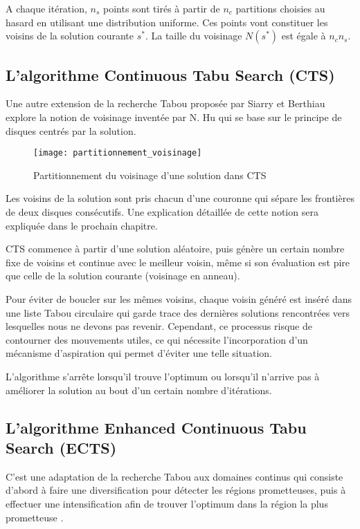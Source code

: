 A chaque itération, $n_s$ points sont tirés à partir de $n_c$ partitions choisies au hasard en utilisant une distribution uniforme. Ces points vont constituer les voisins de la solution courante $s^*$. La taille du voisinage $N(s^*)$ est égale à $n_c n_s$.

\subsection{L'algorithme Continuous Tabu Search (CTS)}
Une autre extension de la recherche Tabou proposée par Siarry et Berthiau \cite{siarry1997fitting} explore la notion de voisinage inventée par N. Hu \cite{Hu_1992} qui se base sur le principe de disques centrés par la solution.

\begin{figure}[H]
	\centering
	\texttt{[image: partitionnement\_voisinage]}
	\caption{Partitionnement du voisinage d'une solution dans CTS}
\end{figure}

Les voisins de la solution sont pris chacun d'une couronne qui sépare les frontières de deux disques consécutifs. Une explication détaillée de cette notion sera expliquée dans le prochain chapitre.

CTS commence à partir d'une solution aléatoire, puis génère un certain nombre fixe de voisins et continue avec le meilleur voisin, même si son évaluation est pire que celle de la solution courante (voisinage en anneau).

Pour éviter de boucler sur les mêmes voisins, chaque voisin généré est inséré dans une liste Tabou circulaire qui garde trace des dernières solutions rencontrées vers lesquelles nous ne devons pas revenir. Cependant, ce processus risque de contourner des mouvements utiles, ce qui nécessite l'incorporation d'un mécanisme d'aspiration qui permet d'éviter une telle situation.  

L'algorithme s'arrête lorsqu'il trouve l'optimum ou lorsqu'il n'arrive pas à améliorer la solution au bout d'un certain nombre d'itérations.
 
\subsection{L'algorithme Enhanced Continuous Tabu Search (ECTS)}
C'est une adaptation de la recherche Tabou aux domaines continus qui consiste d'abord à faire une diversification pour détecter les régions prometteuses, puis à effectuer une intensification afin de trouver l'optimum dans la région la plus prometteuse \cite{Chelouadh_siarry_2001} .

